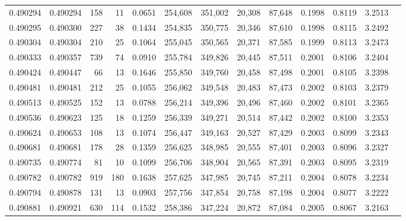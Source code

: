 \begin{tabular}{rrrrrrrrrrrrr}
0.490294 & 0.490294 &   158 &    11 &                                     0.0651 & 254,608 & 351,002 &  20,308 &  87,648 & 0.1998 & 0.8119 & 3.2513 \\
0.490295 & 0.490300 &   227 &    38 &                                     0.1434 & 254,835 & 350,775 &  20,346 &  87,610 & 0.1998 & 0.8115 & 3.2492 \\
0.490304 & 0.490304 &   210 &    25 &                                     0.1064 & 255,045 & 350,565 &  20,371 &  87,585 & 0.1999 & 0.8113 & 3.2473 \\
0.490333 & 0.490357 &   739 &    74 &                                     0.0910 & 255,784 & 349,826 &  20,445 &  87,511 & 0.2001 & 0.8106 & 3.2404 \\
0.490424 & 0.490447 &    66 &    13 &                                     0.1646 & 255,850 & 349,760 &  20,458 &  87,498 & 0.2001 & 0.8105 & 3.2398 \\
0.490481 & 0.490481 &   212 &    25 &                                     0.1055 & 256,062 & 349,548 &  20,483 &  87,473 & 0.2002 & 0.8103 & 3.2379 \\
0.490513 & 0.490525 &   152 &    13 &                                     0.0788 & 256,214 & 349,396 &  20,496 &  87,460 & 0.2002 & 0.8101 & 3.2365 \\
0.490536 & 0.490623 &   125 &    18 &                                     0.1259 & 256,339 & 349,271 &  20,514 &  87,442 & 0.2002 & 0.8100 & 3.2353 \\
0.490624 & 0.490653 &   108 &    13 &                                     0.1074 & 256,447 & 349,163 &  20,527 &  87,429 & 0.2003 & 0.8099 & 3.2343 \\
0.490681 & 0.490681 &   178 &    28 &                                     0.1359 & 256,625 & 348,985 &  20,555 &  87,401 & 0.2003 & 0.8096 & 3.2327 \\
0.490735 & 0.490774 &    81 &    10 &                                     0.1099 & 256,706 & 348,904 &  20,565 &  87,391 & 0.2003 & 0.8095 & 3.2319 \\
0.490782 & 0.490782 &   919 &   180 &                                     0.1638 & 257,625 & 347,985 &  20,745 &  87,211 & 0.2004 & 0.8078 & 3.2234 \\
0.490794 & 0.490878 &   131 &    13 &                                     0.0903 & 257,756 & 347,854 &  20,758 &  87,198 & 0.2004 & 0.8077 & 3.2222 \\
0.490881 & 0.490921 &   630 &   114 &                                     0.1532 & 258,386 & 347,224 &  20,872 &  87,084 & 0.2005 & 0.8067 & 3.2163 \\

\end{tabular}
